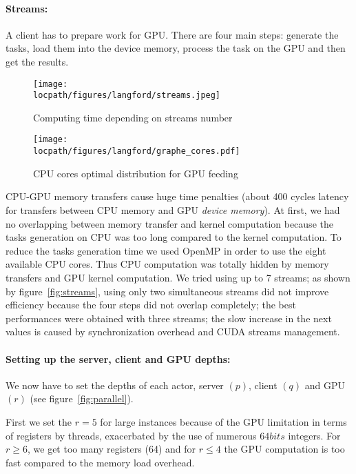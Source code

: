 \paragraph{Streams:}
A client has to prepare work for GPU. There are four main steps: generate the tasks, load them into the device memory, process the task on the GPU and then get the results.

\begin{figure}[t!]
\begin{minipage}[b]{0.48\linewidth}
\centering
\texttt{[image: \\locpath/figures/langford/streams.jpeg]}
\caption{Computing time depending on streams number}
\label{fig:streams}
\end{minipage}
\hfill
\begin{minipage}[b]{0.48\linewidth}
\centering
\texttt{[image: \\locpath/figures/langford/graphe\_cores.pdf]}
\caption{CPU cores optimal distribution for GPU feeding}\label{cores_rep}
\end{minipage}
\end{figure}

CPU-GPU memory transfers cause huge time penalties (about 400 cycles latency for transfers between CPU memory and GPU \emph{device memory}). 
At first, we had no overlapping between memory transfer and kernel computation because the tasks generation on CPU was too long compared to the kernel computation.
To reduce the tasks generation time we used OpenMP in order to use the eight available CPU cores.
Thus CPU computation was totally hidden by memory transfers and GPU kernel computation. We tried using up to 7 streams; as shown by figure~\ref{fig:streams}, using only two simultaneous streams did not improve efficiency because the four steps did not overlap completely; the best performances were obtained with three streams; the slow increase in the next values is caused by synchronization overhead and CUDA streams management.

\paragraph{Setting up the server, client and GPU depths: }
We now have to set the depths of each actor, server $(p)$, client $(q)$ and GPU $(r)$ (see figure~\ref{fig:parallel}).

First we set the $r = 5$ for large instances because of the GPU limitation in terms of registers by threads, exacerbated by the use of numerous $64bits$ integers. For $r \geq 6$, we get too many registers (64) and for $r \leq 4$ the GPU computation is too fast compared to the memory load overhead.

